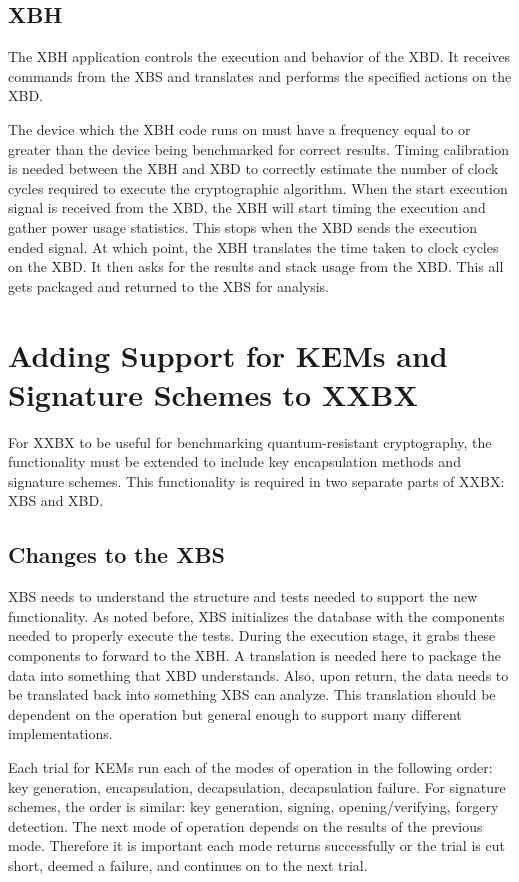 \documentclass[10pt]{article}
\begin{document}
\subsection{XBH}
The XBH application controls the execution and behavior of the XBD. It receives commands 
from the XBS and translates and performs the specified actions on the XBD.

The device which the XBH code runs on must have a frequency equal to or greater than the 
device being benchmarked for correct results. Timing calibration is needed between the XBH 
and XBD to correctly estimate the number of clock cycles required to execute the cryptographic 
algorithm. When the start execution signal is received from the XBD, the XBH will start timing 
the execution and gather power usage statistics. This stops when the XBD sends the 
execution ended signal. At which point, the XBH translates the time taken to clock cycles 
on the XBD. It then asks for the results and stack usage from the XBD.
This all gets packaged and returned to the XBS for analysis.

\section{Adding Support for KEMs and Signature Schemes to XXBX}

For XXBX to be useful for benchmarking quantum-resistant cryptography, the functionality 
must be extended to include key encapsulation methods and signature schemes. This 
functionality is required in two separate parts of XXBX: XBS and XBD.

\subsection{Changes to the XBS}\label{sec:rom}
XBS needs to understand the structure and tests needed to support the new functionality. 
As noted before, XBS initializes the database with the components needed to properly 
execute the tests. During the execution stage, it grabs these components to forward 
to the XBH. A translation is needed here to package the data into something that XBD  
understands. Also, upon return, the data needs to be translated back into something XBS 
can analyze. This translation should be dependent on the operation but general enough to 
support many different implementations.

Each trial for KEMs run each of the modes of operation in the following order: key generation, 
encapsulation, decapsulation, decapsulation failure. For signature schemes, the order is 
similar: key generation, signing, opening/verifying, forgery detection. The next mode of 
operation depends on the results of the previous mode. Therefore it is important each mode 
returns successfully or the trial is cut short, deemed a failure, and continues on to the 
next trial.
\end{document}
